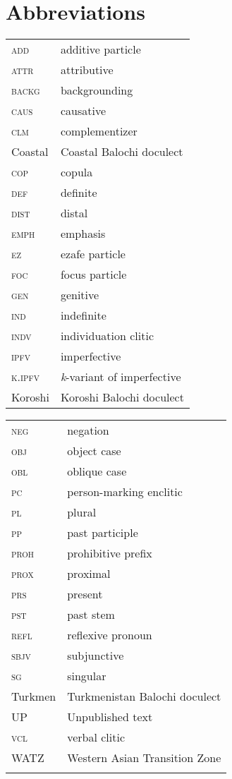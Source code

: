\documentclass[output=paper,colorlinks,citecolor=brown,draftmode]{langscibook}
\begin{document}
\section*{Abbreviations}
\begin{tabularx}{.45\textwidth}{lQ}
\textsc{add} & additive particle \\
\textsc{attr} & attributive \\
\textsc{backg} & backgrounding \\
\textsc{caus} & causative \\
\textsc{clm} & complementizer \\
Coastal & Coastal Balochi doculect \\
\textsc{cop} & {copula} \\
\textsc{def} & definite \\
\textsc{dist} & distal \\
\textsc{emph} & {emphasis} \\
\textsc{ez} & ezafe particle \\
\textsc{foc} & {focus} particle \\
\textsc{gen} & genitive  \\
\textsc{ind} & indefinite \\
\textsc{indv} & individuation {clitic} \\
\textsc{ipfv} & imperfective \\
\textsc{k.ipfv} & \textit{k}-variant of imperfective \\
Koroshi & Koroshi Balochi doculect \\
\end{tabularx}
\begin{tabularx}{.45\textwidth}{lQ}
\textsc{neg} & negation \\
\textsc{obj} & {object} case \\
\textsc{obl} & {oblique} case \\
\textsc{pc} & person-marking enclitic \\
\textsc{pl} & plural \\
\textsc{pp} & past participle \\
\textsc{proh} & prohibitive prefix \\
\textsc{prox} & proximal  \\
\textsc{prs} & present \\
\textsc{pst} & past stem \\
\textsc{refl} & reflexive {pronoun} \\
\textsc{sbjv} & subjunctive \\
\textsc{sg} & singular \\
Turkmen & Turkmenistan Balochi doculect \\
UP & Unpublished text \\
\textsc{vcl} & verbal {clitic} \\
WATZ & Western Asian Transition Zone\\
\\
\end{tabularx}

\sloppy
\printbibliography[heading=subbibliography,notkeyword=this]
\end{document}
